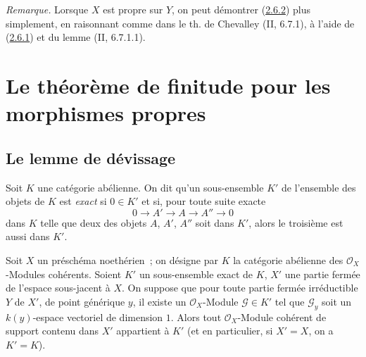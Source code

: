 \begin{env}[2.6.3]
\label{III.2.6.3-fr}
\emph{Remarque.} Lorsque $X$ est propre sur $Y$, on peut démontrer
(\hyperref[III.2.6.2-fr]{2.6.2}) plus simplement, en raisonnant comme dans
le th. de Chevalley (II, 6.7.1), à l'aide de
(\hyperref[III.2.6.1-fr]{2.6.1}) et du lemme (II, 6.7.1.1).
\end{env}

\section{Le théorème de finitude pour les morphismes propres}
\label{section:III.3-fr}

\subsection{Le lemme de dévissage}
\label{subsection:III.3.1-fr}

\begin{definition}[3.1.1]
\label{III.3.1.1-fr}
Soit $K$ une catégorie abélienne. On dit qu'un sous-ensemble $K'$ de
l'ensemble des objets de $K$ est \emph{exact} si $0\in K'$ et si, pour toute
suite exacte
\[
0\longrightarrow A'\longrightarrow A\longrightarrow A''\longrightarrow0
\]
dans $K$ telle que deux des objets $A$, $A'$, $A''$ soit dans $K'$, alors le
troisième est aussi dans $K'$.
\end{definition}

\begin{theorem}[3.1.2]
\label{III.3.1.2-fr}
Soit $X$ un préschéma noethérien~; on désigne par $K$ la catégorie abélienne
des $\mathcal O_X$-Modules cohérents. Soient $K'$ un sous-ensemble exact de
$K$, $X'$ une partie fermée de l'espace sous-jacent à $X$. On suppose que
pour toute partie fermée irréductible $Y$ de $X'$, de point générique $y$, il
existe un $\mathcal O_X$-Module $\mathcal G\in K'$ tel que $\mathcal G_y$ soit
un $k(y)$-espace vectoriel de dimension $1$. Alors tout $\mathcal O_X$-Module
cohérent de support contenu dans $X'$ appartient à $K'$ (et en particulier,
si $X'=X$, on a $K'=K$).
\end{theorem}

